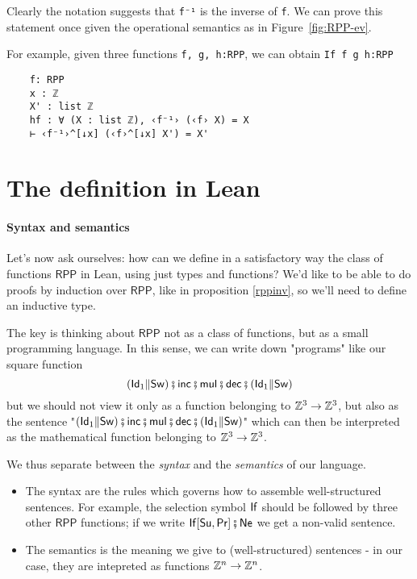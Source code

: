 \documentclass[runningheads]{llncs}
\newcommand{\RPP}{\textsf{RPP}\xspace}
\begin{document}
Clearly the notation suggests that \lstinline|f⁻¹| is the inverse of \lstinline|f|. We can prove this statement once given the operational semantics as in Figure~\ref{fig:RPP-ev}.


For example, given three functions \lstinline|f, g, h:RPP|, we can obtain \lstinline|If f g h:RPP|
\begin{lstlisting}
    f: RPP
    x : ℤ
    X' : list ℤ
    hf : ∀ (X : list ℤ), ‹f⁻¹› (‹f› X) = X
    ⊢ ‹f⁻¹›^[↓x] (‹f›^[↓x] X') = X'
\end{lstlisting}






\section{The definition in Lean}

\paragraph{Syntax and semantics}
Let's now ask ourselves: how can we define in a satisfactory way the class of functions $\RPP$ in Lean,
using just types and functions?
We'd like to be able to do proofs by induction over $\RPP$, like in proposition \ref{rppinv}, so we'll need to define an inductive type.

The key is thinking about $\RPP$ not as a class of functions, but as a small programming language.
In this sense, we can write down "programs" like our square function
\[(\mathsf{Id}_1 \Vert \mathsf{Sw}) \fatsemi \mathsf{inc} \fatsemi \mathsf{mul} \fatsemi \mathsf{dec} \fatsemi (\mathsf{Id}_1 \Vert \mathsf{Sw})\]
but we should not view it only as a function belonging to $\mathbb{Z}^3 \to \mathbb{Z}^3$,
but also as the sentence
"$(\mathsf{Id}_1 \Vert \mathsf{Sw}) \fatsemi \mathsf{inc} \fatsemi \mathsf{mul} \fatsemi \mathsf{dec} \fatsemi (\mathsf{Id}_1 \Vert \mathsf{Sw})$"
which can then be interpreted as the mathematical function belonging to $\mathbb{Z}^3 \to \mathbb{Z}^3$.

We thus separate between the \textit{syntax} and the \textit{semantics} of our language.
\begin{itemize}
    \item The syntax are the rules which governs how to assemble well-structured sentences.
    For example, the selection symbol $\mathsf{If}$ should be followed by three other $\RPP$ functions;
    if we write $\mathsf{If}[\mathsf{Su}, \mathsf{Pr}] \fatsemi \mathsf{Ne}$ we get a non-valid sentence.
    \item The semantics is the meaning we give to (well-structured) sentences -
    in our case, they are intepreted as functions $\mathbb{Z}^n \to \mathbb{Z}^n$.
\end{itemize}
\end{document}
